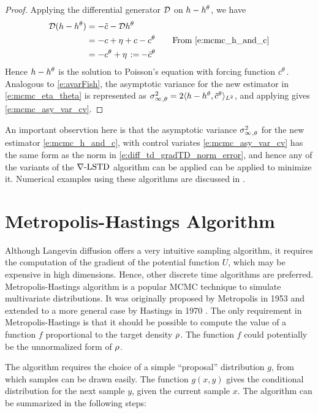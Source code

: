\begin{proof}
	Applying the differential generator ${\cal D}$ on $h - h^\theta$, we have
	\begin{equation}
	\begin{aligned}
	\generate ( h -h^\param) & = - \tilc - \generate h^\param\\
	& = - c + \eta + c - c^\param  \qquad \text{From \eqref{e:mcmc_h_and_c}} \\
	& = - c^\param + \eta\, \eqdef -\tilc^\param
	\end{aligned}	
	\label{e:mcmc_proof_i}
	\end{equation}
	Hence $h-h^\theta$ is the solution to Poisson's equation with forcing function $c^\theta$. Analogous to \eqref{e:avarFish}, the asymptotic variance for the new estimator in \eqref{e:mcmc_eta_theta} is represented as ${\sigma^2_\infty}_{,\theta} = 2 \langle h - h^\theta, \tilde c^\theta \rangle_{L^2}$, and applying  gives \eqref{e:mcmc_asy_var_cv}.
\end{proof}

An important observtion here is that the asymptotic variance ${\sigma^2_\infty}_{,\theta}$ for the new estimator \eqref{e:mcmc_h_and_c}, with control variates \eqref{e:mcmc_asy_var_cv} has the same form as the norm in \eqref{e:diff_td_gradTD_norm_error}, and hence any of the variants of the $\nabla\text{-LSTD}$ algorithm can be applied can be applied to minimize it. Numerical examples using these algorithms are discussed in .

\section{Metropolis-Hastings Algorithm}
\label{s:mcmc_metropolis}
Although Langevin diffusion offers a very intuitive sampling algorithm, it requires the computation of the gradient of the potential function $U$, which may be expensive in high dimensions. Hence, other discrete time algorithms are preferred. Metropolis-Hastings algorithm is a popular MCMC technique to simulate multivariate distributions. It was originally proposed by Metropolis in 1953 and extended to a more general case by Hastings in 1970 \cite{has70}. The only requirement in Metropolis-Hastings is that it should be possible to compute the value of a function $f$ proportional to the target density $\rho$. The function $f$ could potentially be the unnormalized form of $\rho$.

The algorithm requires the choice of a simple ``proposal'' distribution $g$, from which samples can be drawn easily. The function $g(x,y)$ gives the conditional distribution for the next sample $y$, given the current sample $x$.  The algorithm can be summarized in the following steps:

